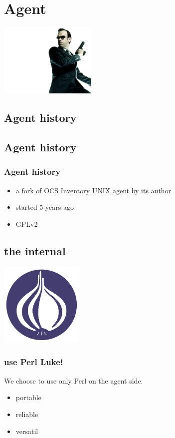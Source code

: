 %
\section{Agent}
\includegraphics[height=3.5cm]{./pics/agent-smith.jpg}
\subsection{Agent history}
\subsection{Agent history}
\begin{frame}
\frametitle{Agent history}

\begin{itemize}
%
\item a fork of OCS Inventory UNIX agent by its author
\item started 5 years ago
\item GPLv2
%
\end{itemize}
\end{frame}
\subsection{the internal}
\begin{frame}
\includegraphics[height=4.0cm]{pics/Perl_Foundation.pdf}
\frametitle{use Perl Luke!}

We choose to use only Perl on the agent side.
\begin{itemize}
\item portable
\item reliable
\item versatil
\end{itemize}
\end{frame}

